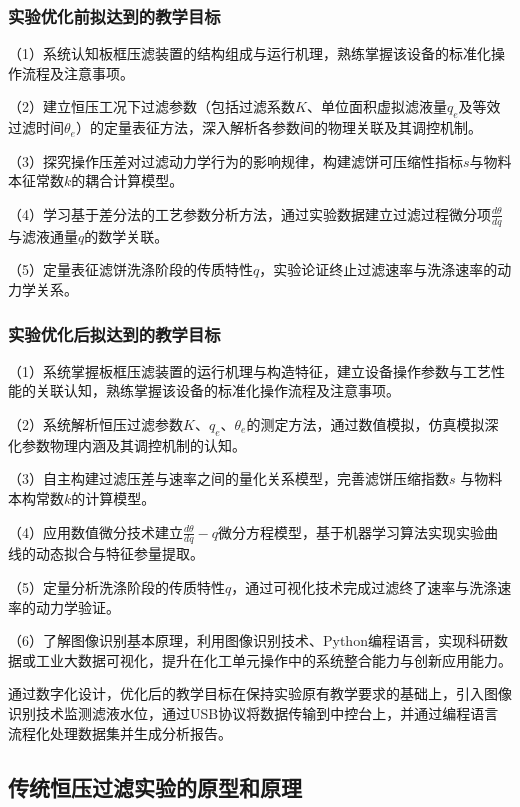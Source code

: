 \subsubsection{实验优化前拟达到的教学目标}

（1）系统认知板框压滤装置的结构组成与运行机理，熟练掌握该设备的标准化操作流程及注意事项。

（2）建立恒压工况下过滤参数（包括过滤系数$K$、单位面积虚拟滤液量$q_e$及等效过滤时间$\theta_e$）的定量表征方法，深入解析各参数间的物理关联及其调控机制。

（3）探究操作压差对过滤动力学行为的影响规律，构建滤饼可压缩性指标$s$与物料本征常数$k$的耦合计算模型。

（4）学习基于差分法的工艺参数分析方法，通过实验数据建立过滤过程微分项$\frac{d\theta}{dq}$与滤液通量$q$的数学关联。

（5）定量表征滤饼洗涤阶段的传质特性$q$，实验论证终止过滤速率与洗涤速率的动力学关系。

\subsubsection{实验优化后拟达到的教学目标}

（1）系统掌握板框压滤装置的运行机理与构造特征，建立设备操作参数与工艺性能的关联认知，熟练掌握该设备的标准化操作流程及注意事项。

（2）系统解析恒压过滤参数$K$、$q_e$、$\theta_e$的测定方法，通过数值模拟，仿真模拟深化参数物理内涵及其调控机制的认知。

（3）自主构建过滤压差与速率之间的量化关系模型，完善滤饼压缩指数$s$ 与物料本构常数$k$的计算模型。

（4）应用数值微分技术建立$\frac{d\theta}{dq} - q$微分方程模型，基于机器学习算法实现实验曲线的动态拟合与特征参量提取。

（5）定量分析洗涤阶段的传质特性$q$，通过可视化技术完成过滤终了速率与洗涤速率的动力学验证。

（6）了解图像识别基本原理，利用图像识别技术、Python编程语言，实现科研数据或工业大数据可视化，提升在化工单元操作中的系统整合能力与创新应用能力。

通过数字化设计，优化后的教学目标在保持实验原有教学要求的基础上，引入图像识别技术监测滤液水位，通过USB协议将数据传输到中控台上，并通过编程语言流程化处理数据集并生成分析报告。

\subsection{传统恒压过滤实验的原型和原理}

